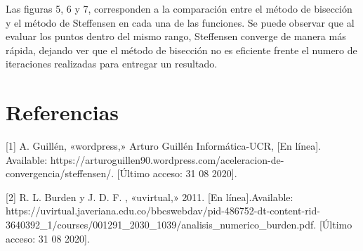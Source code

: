 \documentclass[]{hdsr}
\begin{document}
        
    Las figuras 5, 6 y 7, corresponden a la comparación entre el método de bisección y el método de Steffensen en cada una de las funciones. Se puede observar que al evaluar los puntos dentro del mismo rango, Steffensen converge de manera más rápida, dejando ver que el método de bisección no es eficiente frente el numero de iteraciones realizadas para entregar un resultado.

\section{Referencias}

[1] A. Guillén, «wordpress,» Arturo Guillén Informática-UCR, [En línea]. \newline
Available: https://arturoguillen90.wordpress.com/aceleracion-de-convergencia/steffensen/. [Último acceso: 31 08 2020].

[2] R. L. Burden y J. D. F. , «uvirtual,» 2011. [En línea].\newline Available: https://uvirtual.javeriana.edu.co/bbcswebdav/pid-486752-dt-content-rid-3640392_1\newline/courses/001291_2030_1039/analisis_numerico_burden.pdf. [Último acceso: 31 08 2020].
\end{document}
